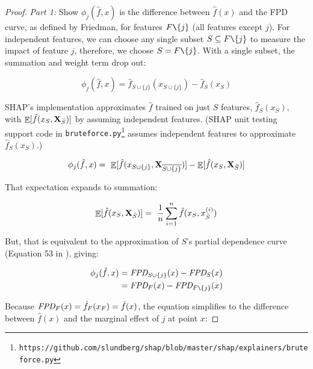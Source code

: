\documentclass[11pt]{article}
\newcommand{\cut}[1]{}
\DeclareMathOperator{\Ex}{\mathbb{E}}
\begin{document}
\begin{proof}
{\em Part 1: } Show $\phi_j(\hat{f},x)$ is the difference between $\hat{f}(x)$ and the FPD curve, as defined by Friedman, for features $F \texttt{\char`\\} \{j\}$ (all features except $j$). For independent features, we can choose any single subset $S \subseteq F \texttt{\char`\\} \{j\}$ to measure the impact of feature $j$, therefore, we choose $S = F \texttt{\char`\\} \{j\}$.  With a single subset, the summation and weight term drop out:

\[
\phi_j(\hat{f},x) = \hat{f}_{S \cup \{j\}}(x_{S \cup \{j\}}) - \hat{f}_S(x_S)
\]

\noindent SHAP's implementation approximates $\hat{f}$ trained on just $S$ features, $\hat{f}_S(x_S)$, with $\Ex[\hat{f}(x_{S},{\bf X}_{\bar{S}})]$ by assuming independent features.  (SHAP unit testing support code in {\tt\small bruteforce.py}\footnote{\tt https://github.com/slundberg/shap/blob/master/shap/explainers/bruteforce.py} assumes independent features to approximate $\hat{f}_S(x_S)$.)

\[
\phi_j(\hat{f},x) = \
 \Ex[\hat{f}(x_{S \cup \{j\}},{\bf X}_{\overline{S \cup \{j\}}})] - \Ex[\hat{f}(x_{S},{\bf X}_{\bar{S}})]
\]

\noindent  That expectation expands to summation:

\[
\Ex[\hat{f}(x_{S},{\bf X}_{\bar{S}})] = \
    \frac{1}{n} \sum_{i=1}^n \hat{f}(x_S, x_{\bar{S}}^{(i)})
\]

\noindent But, that is equivalent to the approximation of $S$'s partial dependence curve (Equation 53 in \citealt{PDP}), giving:

\[
\begin{split}
\phi_j(\hat{f},x) & = \text{\it FPD}_{S \cup \{j\}}(x) - \text{\it FPD}_{S}(x)\\
 & = \text{\it FPD}_{F}(x) - \text{\it FPD}_{F \texttt{\char`\\} \{j\}}(x)
\end{split}
\]

\cut{
$\phi_j$ is, therefore, the difference between points on two partial dependence curves, one curve derived using $F$, which is just $\hat{f}(x)$, and one derived from $F \texttt{\char`\\} \{j\}$. 
}

\noindent  Because $\text{\it FPD}_{F}(x) = \hat{f}_F(x_F) = \hat{f}(x)$, the equation simplifies to the difference between $\hat{f}(x)$ and the marginal effect of $j$ at point $x$:


\end{proof}
\end{document}
